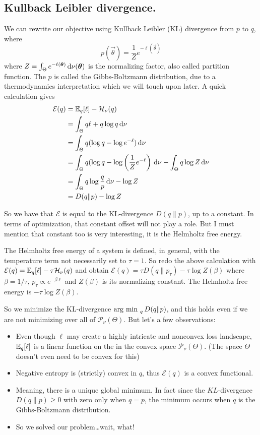 \documentclass[12pt]{amsart}
\begin{document}
\subsection*{Kullback Leibler divergence.}

We can rewrite our objective using Kullback Leibler (KL) divergence from $p$ to $q$, where
\[
	p(\vec{\theta}) = \frac{1}{Z} e^{-\ell(\vec{\theta})}
\] 
where $Z = \int_{\Theta} e^{-\ell(\mathbf{\boldsymbol{\theta}})} \,\mathrm{d}\nu(\mathbf{\boldsymbol{\theta}})$ is the normalizing factor, also called partition function. The $p$ is called the Gibbs-Boltzmann distribution, due to a thermodynamics interpretation which we will touch  upon later. A quick calculation gives
\begin{align*}
	\mathcal{E}(q) &= \mathbb{E}_{q}[\ell] - \mathcal{H}_\nu(q) \\
	&= \int_{\Theta} q \ell  + q \log q \,\mathrm{d}\nu \\
	&= \int_{\Theta} q( \log q - \log e^{-\ell}) \,\mathrm{d}\nu \\
	& = \int_{\Theta} q( \log q - \log \left(\frac{1}{Z} e^{-\ell}\right) \,\mathrm{d}\nu - \int_{\Theta} q \log Z\,\mathrm{d}\nu \\
	&= \int_{\Theta} q \log \frac{q}{p} \,\mathrm{d}\nu - \log Z \\
	&= D(q\| p) - \log Z 
\end{align*}

So we have that $\mathcal{E}$ is equal to the KL-divergence $D(q\|p)$, up to a constant. In terms of optimization, that constant offset will not play a role. But I must mention that constant too is very interesting, it is the Helmholtz free energy.
\begin{exercise}
The Helmholtz free energy of a system is defined, in general, with the temperature term not necessarily set to $\tau = 1$. So redo the above calculation with $\mathcal{E}(q) = \mathbb{E}_q[\ell] - \tau\mathcal{H}_\nu(q)$ and obtain $\mathcal{E}(q) = \tau D(q\|p_\tau) -\tau \log Z(\beta)$ where $\beta = 1/\tau$,  $p_\tau \propto e^{-\beta \ell}$ and $Z(\beta)$ is its normalizing constant. The Helmholtz free energy is $- \tau \log Z(\beta)$.
\end{exercise}


So we minimize the KL-divergence $\operatorname*{\arg\,\min\,\,}_{q} D(q\|p)$, and this holds even if we are not minimizing over all of $\mathcal{P}_\nu(\Theta)$. But let's a few observations:
\begin{itemize}
	\item Even though $\ell$ may create a highly intricate and nonconvex loss landscape, $\mathbb{E}_q[\ell]$ is a linear function on the in the convex space $\mathcal{P}_\nu(\Theta)$. (The space $\Theta$ doesn't even need to be convex for this)
	\item Negative entropy is (strictly) convex in $q$, thus $\mathcal{E}(q)$ is a convex functional.
	\item Meaning, there is a unique global minimum. In fact since the $KL$-divergence $D(q\|p) \geq 0$ with zero only when $q = p$, the minimum occurs when $q$ is the Gibbs-Boltzmann distribution.
	\item So we solved our problem\dots wait, what!
\end{itemize}
\end{document}
